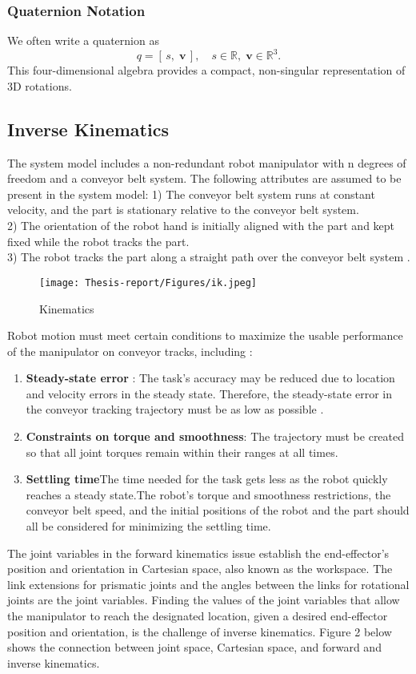 \documentclass[12pt]{article}
\begin{document}
\subsubsection{Quaternion Notation}
We often write a quaternion as
\[
  q = [\,s,\;\mathbf{v}\,],\quad s\in\mathbb{R},\;\mathbf{v}\in\mathbb{R}^3.
\]
This four-dimensional algebra provides a compact, non-singular representation of 3D rotations.

\subsection{Inverse Kinematics}
The system model includes a non-redundant robot manipulator with n degrees of freedom and a conveyor belt system. The following attributes are assumed to be present in the system model: \cite{ref14}
1) The conveyor belt system runs at constant velocity, and the
part is stationary relative to the conveyor belt system\cite{ref14}.\\
2) The orientation of the robot hand is initially aligned with the part and kept fixed while the robot tracks the part\cite{ref14}.\\
3) The robot tracks the part along a straight path over the
conveyor belt system \cite{ref14}.

\begin{figure}[h]
    \centering
    \texttt{[image: Thesis-report/Figures/ik.jpeg]}  
    \caption{Kinematics \cite{ref14}}
    \label{fig:Photoneo Cmaera}
\end{figure}

Robot motion must meet certain conditions to maximize the usable performance of the manipulator on conveyor tracks, including \cite{ref14}:
\begin{enumerate}
    \item \textbf{Steady-state error} : The task's accuracy may be reduced due to location and velocity errors in the steady state. Therefore, the steady-state error in the conveyor tracking trajectory must be as low as possible \cite{ref14}.
    \item \textbf{Constraints on torque and smoothness}: The trajectory must be created so that all joint torques remain within their ranges at all times\cite{ref14}.
    \item \textbf{Settling time}The time needed for the task gets less as the robot quickly reaches a steady state.The robot's torque and smoothness restrictions, the conveyor belt speed, and the initial positions of the robot and the part should all be considered for minimizing the settling time\cite{ref14}.
\end{enumerate}
The joint variables in the forward kinematics issue establish the end-effector's position and orientation in Cartesian space, also known as the workspace. The link extensions for prismatic joints and the angles between the links for rotational joints are the joint variables. Finding the values of the joint variables that allow the manipulator to reach the designated location, given a desired end-effector position and orientation, is the challenge of inverse kinematics.  Figure 2 below shows the connection between joint space, Cartesian space, and forward and inverse kinematics\cite{ref10}.\\
\end{document}
